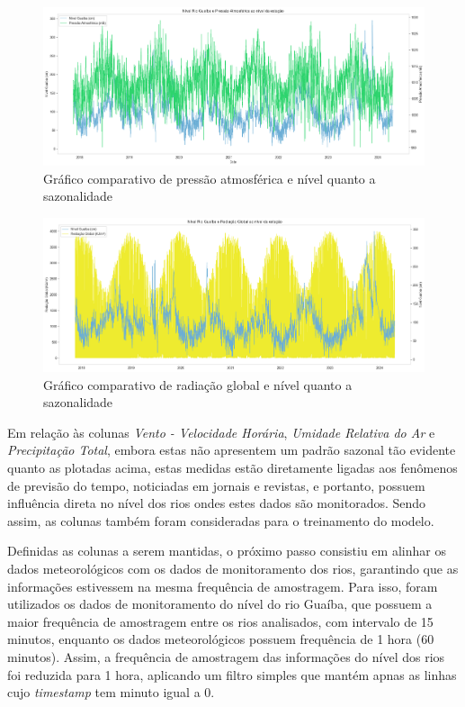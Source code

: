 \begin{figure}[H]
	\caption{\label{fig:comparacao_pressao_nivel_rio}Gráfico comparativo de pressão atmosférica e nível quanto a sazonalidade}
	\begin{center}
		\includegraphics[scale=0.35]{figuras/comparacao_pressao_nivel_rio.png}
	\end{center}
\end{figure}

\begin{figure}[H]
	\caption{\label{fig:comparacao_radiacao_nivel_rio}Gráfico comparativo de radiação global e nível quanto a sazonalidade}
	\begin{center}
		\includegraphics[scale=0.35]{figuras/comparacao_radiacao_nivel_rio.png}
	\end{center}
\end{figure}

Em relação às colunas \textit{Vento - Velocidade Horária}, \textit{Umidade Relativa do Ar} e \textit{Precipitação Total}, embora estas não apresentem um padrão sazonal tão evidente quanto as plotadas acima, estas medidas estão diretamente ligadas aos fenômenos de previsão do tempo, noticiadas em jornais e revistas, e portanto, possuem influência direta no nível dos rios ondes estes dados são monitorados. Sendo assim, as colunas também foram consideradas para o treinamento do modelo.

Definidas as colunas a serem mantidas, o próximo passo consistiu em alinhar os dados meteorológicos com os dados de monitoramento dos rios, garantindo que as informações estivessem na mesma frequência de amostragem. Para isso, foram utilizados os dados de monitoramento do nível do rio Guaíba, que possuem a maior frequência de amostragem entre os rios analisados, com intervalo de 15 minutos, enquanto os dados meteorológicos possuem frequência de 1 hora (60 minutos). Assim, a frequência de amostragem das informações do nível dos rios foi reduzida para 1 hora, aplicando um filtro simples que mantém apnas as linhas cujo \textit{timestamp} tem minuto igual a 0.

